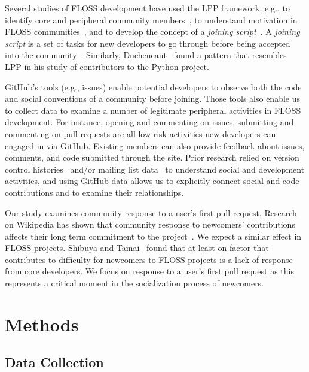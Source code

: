 \documentclass{sigchi}
\begin{document}
Several studies of FLOSS development have used the LPP framework, e.g., to
identify core and peripheral community members~\cite{huang_mining_2005}, to
understand motivation in FLOSS communities~\cite{ye_toward_2003}, and to develop
the concept of a \textit{joining script}~\cite{von_krogh_community_2003}. A
\textit{joining script} is a set of tasks for new developers to go through
before being accepted into the community~\cite{von_krogh_community_2003}.
Similarly, Ducheneaut~\cite{ducheneaut_socialization_2005} found a pattern that
resembles LPP in his study of contributors to the Python project.

GitHub's tools (e.g., issues) enable potential developers to observe both the
code and social conventions of a community before joining. Those tools also
enable us to collect data to examine a number of legitimate peripheral
activities in FLOSS development. For instance, opening and commenting on issues,
submitting and commenting on pull requests are all low risk activities new
developers can engaged in via GitHub. Existing members can also provide feedback
about issues, comments, and code submitted through the site. Prior research
relied on version control histories~\cite{huang_mining_2005} and/or mailing list
data~ \cite{ducheneaut_socialization_2005, von_krogh_community_2003} to
understand social and development activities, and using GitHub data allows us to
explicitly connect social and code contributions and to examine their
relationships.

Our study examines community response to a user's first pull request. Research
on Wikipedia has shown that community response to newcomers' contributions
affects their long term commitment to the project~\cite{choi2010socialization}.
We expect a similar effect in FLOSS projects. Shibuya and
Tamai~\cite{shibuya2009understanding} found that at least on factor that
contributes to difficulty for newcomers to FLOSS projects is a lack of response
from core developers. We focus on response to a user's first pull request as
this represents a critical moment in the socialization process of newcomers.

\section{Methods} \label{chap:methods}

\subsection{Data Collection} \label{sec:datacollection}
\end{document}
